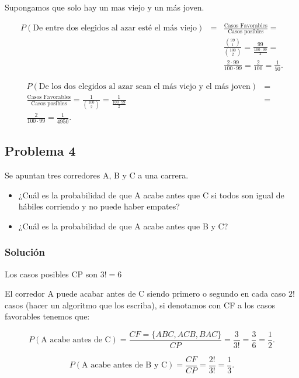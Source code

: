 \documentclass[
]{article}
\providecommand{\tightlist}{%
  \setlength{\itemsep}{0pt}\setlength{\parskip}{0pt}}
\begin{document}
Supongamos que solo hay un mas viejo y un más joven.

\begin{eqnarray*}
P(\mbox{De entre dos elegidos al azar esté el más viejo}) &=&
\frac{\mbox{Casos Favorables}}{\mbox{Casos posibles}}= \\
&&\frac{{{99}\choose {1}}}{{{100}\choose {2}}}=\frac{99}{\frac{100\cdot 99}{2}}=\\
&&\frac{2\cdot 99}{100\cdot 99}=
\frac{2}{100}=\frac{1}{50}.
\end{eqnarray*}

\begin{eqnarray*}
P(\mbox{De los dos elegidos al azar sean  el más viejo y el más joven})&=&\\
\frac{\mbox{Casos Favorables}}{\mbox{Casos posibles}}=
\frac{1}{{{100} \choose {2}}}=\frac{1}{\frac{100\cdot 99}{2}}&=&\\
\frac{2}{100\cdot 99}
=\frac{1}{4950}.
\end{eqnarray*}

\hypertarget{problema-4}{%
\subsection{Problema 4}\label{problema-4}}

Se apuntan tres corredores A, B y C a una carrera.

\begin{itemize}
\tightlist
\item
  ¿Cuál es la probabilidad de que A acabe antes que C si todos son igual
  de hábiles corriendo y no puede haber empates?
\item
  ¿Cuál es la probabilidad de que A acabe antes que B y C?
\end{itemize}

\hypertarget{soluciuxf3n-4}{%
\subsubsection{Solución}\label{soluciuxf3n-4}}

Los casos posibles CP son \(3!=6\)

El corredor A puede acabar antes de C siendo primero o segundo en cada
caso \(2!\) casos (hacer un algoritmo que los escriba), si denotamos con
CF a los casos favorables tenemos que:

\[P(\mbox{A acabe antes de C})=\frac{CF= \{ABC,ACB,BAC\}}{CP}=\frac{3}{3!}=\frac{3}{6}=\frac{1}{2}.\]

\[P(\mbox{A acabe antes de B y C})=\frac{CF}{CP}=\frac{2!}{3!}=\frac{1}{3}.\]
\end{document}

